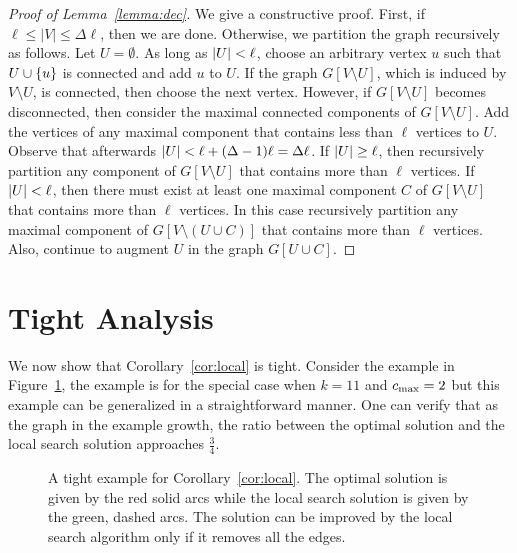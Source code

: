 \medskip

\begin{proof}[Proof of Lemma~\ref{lemma:dec}]
We give a constructive proof.
%
First, if $\ell \leq |V| \leq \Delta \ell$, then we are done.
%
Otherwise, we partition the graph recursively as follows.  Let $U
= \emptyset$.  As long as $\left| U \right| < \ell$, choose an arbitrary vertex
$u$ such that $U \cup \left\{ u \right\}$ is connected and add $u$ to $U$.
%
If the graph $G[V \setminus U]$, which is induced by $V \setminus U$,
is connected, then choose the next vertex.
%
However, if $G[V \setminus U]$ becomes disconnected, then consider the
maximal connected components of $G[V \setminus U]$.  Add the vertices
of any maximal component that contains less than $\ell$ vertices to
$U$.  Observe that afterwards $\left| U \right| < \ell + (\Delta-1) \ell
= \Delta \ell$.
%
If $\left| U \right| \geq \ell$, then recursively partition any component of
$G[V \setminus U]$ that contains more than $\ell$ vertices.
%
If $\left| U \right| < \ell$, then there must exist at least one maximal
component $C$ of $G[V \setminus U]$ that contains more than $\ell$
vertices.  In this case recursively partition any maximal component of
$G[V \setminus (U \cup C)]$ that contains more than $\ell$ vertices.
Also, continue to augment $U$ in the graph $G[U \cup C]$.
\end{proof}




\section{Tight Analysis}
\label{sec:tight}

We now show that Corollary~\ref{cor:local} is tight.  Consider the
example in Figure~\ref{fig:local search tight}, the example is for the
special case when $k = 11$ and $c_{\max} = 2$ but this example can be
generalized in a straightforward manner.  One can verify that as the
graph in the example growth, the ratio between the optimal solution
and the local search solution approaches $\frac{3}{4}$.

\begin{figure}[h]
\begin{center}
\scalebox{.85}{}
\caption{A tight example for Corollary~\ref{cor:local}. 
The optimal solution is given by the red solid arcs while the local
search solution is given by the green, dashed arcs.  The solution can
be improved by the local search algorithm only if it removes all the
edges.}
\label{fig:local search tight}
\end{center}
\end{figure}

